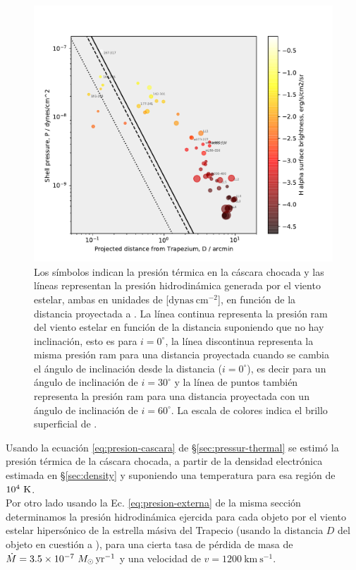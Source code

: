 \begin{figure}
  \centering
  \includegraphics[width=\linewidth, clip]{luis-programas/will-Pshell-vs-D.pdf}
  \caption{Los símbolos indican la presión térmica en la cáscara chocada  y las líneas representan la presión hidrodinámica generada por el viento estelar, ambas en unidades de [\(\mathrm{dynas~cm^{-2}}\)], en función de la distancia proyectada a \thC{}. La línea continua representa la presión ram del viento estelar en función de la distancia suponiendo que no hay inclinación, esto es para \(i = 0^{\circ}\), la línea discontinua representa la misma presión ram para una distancia proyectada cuando se cambia el ángulo de inclinación desde la distancia (\(i = 0^{\circ}\)), es decir para un ángulo de inclinación de \(i = 30^{\circ}\) y la línea de puntos también representa la presión ram para una distancia proyectada con un ángulo de inclinación de \(i = 60^{\circ}\). La escala de colores indica el brillo superficial de \ha{}. }
 \label{fig:pressure}
\end{figure}

Usando la ecuación \ref{eq:presion-cascara} de \S\ref{sec:pressur-thermal} se estimó la presión térmica de la cáscara chocada, a partir de la densidad electrónica estimada en \S\ref{sec:density} y suponiendo una temperatura para esa región de \(10^{4}~\mathrm{K}\).\\

 Por otro lado usando la Ec. \ref{eq:presion-externa} de la misma sección determinamos la presión hidrodinámica ejercida para cada objeto por el viento estelar hipersónico de la estrella másiva \thC{} del Trapecio (usando la distancia \(D\) del objeto en cuestión a \thC{}), para una cierta tasa de pérdida de masa de \(\dot{M} = 3.5 \times 10^{-7}~M_\odot\,\mathrm{yr^{-1}}\) y una velocidad de \(v = 1200~\mathrm{km~s^{-1}}\). \\

